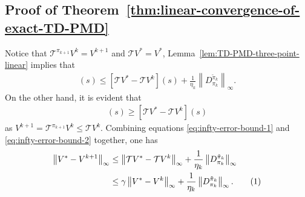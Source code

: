 \documentclass[10pt]{article}
\newcommand{\calT}{\mathcal{T}}
\newcommand{\ls}{\left}
\newcommand{\rs}{\right}
\newcommand\numberthis{\addtocounter{equation}{1}\tag{\theequation}}
\theoremstyle{plain}
\theoremstyle{definition}
\begin{document}
\subsection{Proof of Theorem~\ref{thm:linear-convergence-of-exact-TD-PMD}}
\label{sec:pf:thm:linear-convergence-of-exact-TD-PMD}
Notice that $\calT^{\pi_{k+1}}V^k = V^{k+1}$ and $\calT V^* = V^*$, Lemma~\ref{lem:TD-PMD-three-point-linear} implies that
\begin{align}
    [V^* - V^{k+1}](s) \leq [\calT V^* - \calT V^k](s) + \frac{1}{\eta_k} \ls\| D_{\pi_k}^{\tilde{\pi}_k} \rs\|_\infty.
    \label{eq:infty-error-bound-1}
\end{align}
On the other hand, it is evident that
\begin{align}
    [V^* - V^{k+1}](s) \geq [\calT V^* - \calT V^k](s)
    \label{eq:infty-error-bound-2}
\end{align}
as $V^{k+1} = \calT^{\pi_{k+1}}V^k \leq \calT V^k$. Combining equations \eqref{eq:infty-error-bound-1} and \eqref{eq:infty-error-bound-2} together, one has
\begin{align*}
    \ls\| V^* - V^{k+1} \rs\|_\infty &\leq \ls\| \calT V^* - \calT V^k \rs\|_\infty + \frac{1}{\eta_k} \ls\| D_{\pi_k}^{\tilde{\pi}_k} \rs\|_\infty \\
    &\leq \gamma \ls\| V^* - V^k \rs\|_\infty + \frac{1}{\eta_k} \ls\| D_{\pi_k}^{\tilde{\pi}_k} \rs\|_\infty. \numberthis \label{eq:infty-error-bound}
\end{align*}
\end{document}
